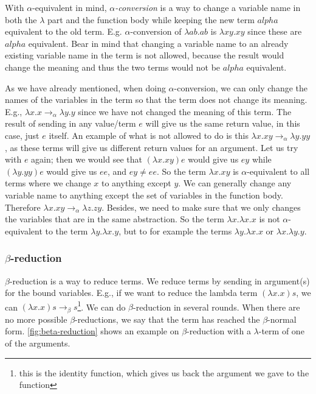 \para
With $\alpha$-equivalent in mind, \emph{$\alpha$-conversion} is a way to change a variable name in both the $\lambda$ part and the function body while keeping the new term $alpha$ equivalent to the old term. E.g. $\alpha$-conversion of $\lambda ab.ab$ is $\lambda xy.xy$ since these are $alpha$ equivalent. Bear in mind that changing a variable name to an already existing variable name in the term is not allowed, because the result would change the meaning and thus the two terms would not be $alpha$ equivalent.

\para
{} As we have already mentioned, when doing $\alpha$-conversion, we can only change the names of the variables in the term so that the term does not change its meaning. 
E.g., $\lambda x.x \rightarrow_\alpha \lambda y.y$ since we have not changed the meaning of this term. The result of sending in any value/term $e$ will give us the same return value, in this case, just $e$ itself. An example of what is not allowed to do is this $\lambda x.xy \rightarrow_\alpha \lambda y.yy$, as these terms will give us different return values for an argument. Let us try with $e$ again; then we would see that  $(\lambda x.xy) e$ would give us $ey$ while $(\lambda y.yy) e$ would give us $ee$, and $ey \neq ee$. So the term $\lambda x.xy$ is $\alpha$-equivalent to all terms where we change $x$ to anything except $y$. We can generally change any variable name to anything except the set of variables in the function body. Therefore $\lambda x.xy \rightarrow_\alpha \lambda z.zy$. Besides, we need to make sure that we only changes the variables that are in the same abstraction. So the term $\lambda x.\lambda x.x $ is not $\alpha$-equivalent to the 
term $\lambda y.\lambda x.y$, but to for example the terms $\lambda y.\lambda x.x$ or $\lambda x.\lambda y.y$.

\subsubsection{$\beta$-reduction}
$\beta$-reduction is a way to reduce terms. We reduce terms by sending in argument(s) for the bound variables. E.g., if we want to reduce the lambda term $(\lambda x. x) s$, we can $(\lambda x. x) s \rightarrow _\beta s$\footnote{this is the identity function, which gives us back the argument we gave to the function}. We can do $\beta$-reduction in several rounds. When there are no more possible $\beta$-reductions, we say that the term has reached the $\beta$-normal form. \autoref{fig:beta-reduction} shows an example on $\beta$-reduction with a $\lambda$-term of one of the arguments. 

